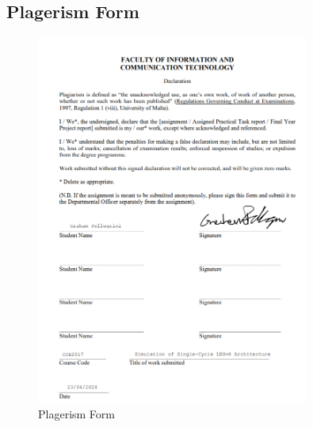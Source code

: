 \documentclass{article}
\begin{document}
\begin{itemize}
\section{Plagerism Form}
\begin{figure}[htbp]
    \centering
    \includegraphics[width=0.8\textwidth]{screen_dumps/plagerism_form.png}
    \caption{Plagerism Form}
    \label{fig:8}
\end{figure}
\end{itemize}
\end{document}
